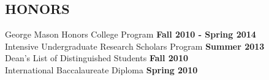 \documentclass[line, margin]{res}
\begin{document}
\begin{resume}
\section{HONORS}
	George Mason Honors College Program \hfill \textbf{Fall 2010 - Spring 2014}	\\
	Intensive Undergraduate Research Scholars Program \hfill \textbf{Summer 2013}	\\
	Dean's List of Distinguished Students \hfill \textbf{Fall 2010}	\\
	International Baccalaureate Diploma \hfill \textbf{Spring 2010}			\\


\end{resume}
\end{document}
